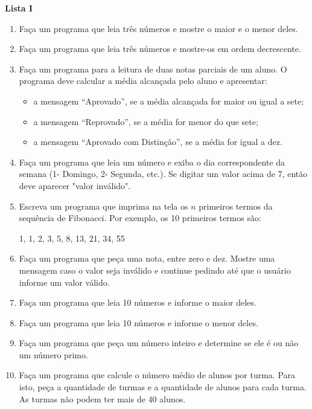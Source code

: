\documentclass[12pt,a4paper]{article}
\begin{document}
\begin{center}
  \textbf{Lista I}
\end{center}

\begin{enumerate}
  \item Faça um programa que leia três números e mostre o maior e o menor deles.
  \item Faça um programa que leia três números e mostre-os em ordem decrescente.
  \item Faça um programa para a leitura de duas notas parciais de um aluno. O programa deve 
  calcular a média alcançada pelo aluno e apresentar:
    \begin{itemize}  
      \item a mensagem ``Aprovado'', se a média alcançada for maior ou igual a sete;
      \item a mensagem ``Reprovado'', se a média for menor do que sete;
      \item a mensagem ``Aprovado com Distinção'', se a média for igual a dez.     
    \end{itemize}
  \item Faça um programa que leia um número e exiba o dia correspondente da semana (1- Domingo,
  2- Segunda, etc.). Se digitar um valor acima de 7, então deve aparecer "valor inválido".
  
  \item Escreva um programa que imprima na tela os $n$ primeiros termos da sequência de Fibonacci.
  Por exemplo, os 10 primeiros termos são:
  
  \begin{center}
    1, 1, 2, 3, 5, 8, 13, 21, 34, 55
  \end{center}
  
  \item Faça um programa que peça uma nota, entre zero e dez. Mostre uma mensagem caso o valor seja
  inválido e continue pedindo até que o usuário informe um valor válido.
  
  \item Faça um programa que leia 10 números e informe o maior deles.
  
  \item Faça um programa que leia 10 números e informe o menor deles.

  \item Faça um programa que peça um número inteiro e determine se ele é ou não um número primo.
  
  \item Faça um programa que calcule o número médio de alunos por turma. Para isto,
  peça a quantidade de turmas e a quantidade de alunos para cada turma. As turmas não podem ter
  mais de 40 alunos.
  
\end{enumerate}
\end{document}
